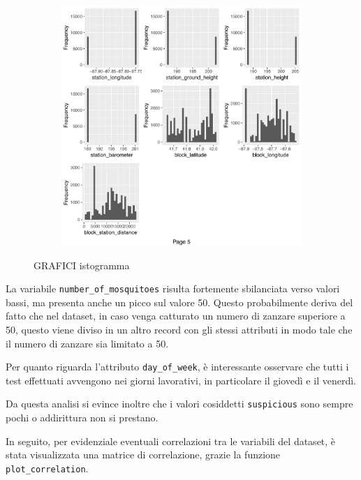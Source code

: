 \begin{figure}[H]
	\ContinuedFloat 
	\begin{subfigure}[t]{0.49\textwidth}
		\includegraphics[width=\textwidth]{images/ml/plot_histogram5}
	\end{subfigure}
\caption{GRAFICI istogramma}
\label{fig:plot_histogram}
\end{figure}

La variabile \texttt{number\_of\_mosquitoes} risulta fortemente sbilanciata 
verso valori bassi, ma presenta anche un picco sul valore 50. Questo 
probabilmente deriva del fatto che nel dataset, in caso venga catturato un 
numero di zanzare superiore a 50, questo viene diviso in un altro record con 
gli stessi attributi in modo tale che il numero di zanzare sia limitato a 50.  

Per quanto riguarda l'attributo \texttt{day\_of\_week}, è interessante 
osservare che tutti i test effettuati avvengono nei giorni lavorativi, in 
particolare il giovedì e il venerdì. 



 Da questa analisi si evince inoltre che i valori cosiddetti 
 \texttt{suspicious} sono sempre pochi o addirittura non si prestano.



In seguito, per evidenziale eventuali correlazioni tra le variabili del 
dataset, è stata visualizzata una matrice di correlazione, grazie la funzione 
\texttt{plot\_correlation}.

